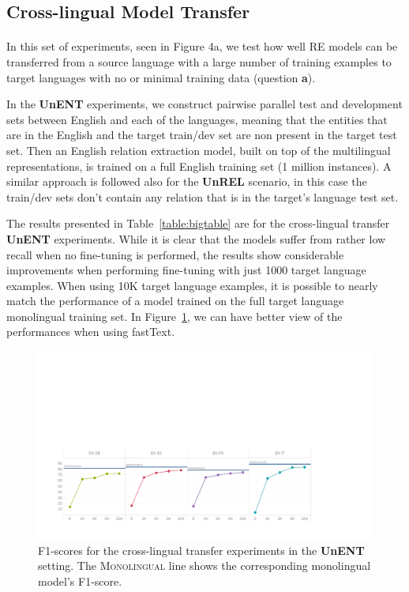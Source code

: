 \newpage
\subsection{Cross-lingual Model Transfer}
\paragraph{}
In this set of experiments, seen in Figure 4a, we test how well RE models can be transferred from a source language with a large number of training examples to target languages with no or minimal training data (question \textbf{a}). 

In the \textbf{UnENT} experiments, we construct pairwise parallel test and development sets between English and each of the languages, meaning that the entities that are in the English and the target train/dev set are non present in the target test set. Then an English relation extraction model, built  on  top  of  the  multilingual representations, is trained on a full English training set (1 million instances). A similar approach is followed also for the \textbf{UnREL} scenario, in this case the train/dev sets don't contain any relation that is in the target's language test set.

The results presented in Table~\ref{table:bigtable} are for the cross-lingual transfer \textbf{UnENT} experiments. While it is clear that the models suffer from rather low recall when no fine-tuning is performed,  the  results  show considerable  improvements when performing fine-tuning with just 1000 target language examples. When using 10K target language examples, it is possible to nearly match the performance of a model trained on the full target language monolingual training set. In Figure~\ref{fig:UnEntF1}, we can have better view of the performances when using fastText.

\begin{figure}[h!]
\centering
\includegraphics[width=\textwidth]{images/UnENT_color_fixed.pdf}
\caption{F1-scores for the cross-lingual transfer experiments in the \textbf{UnENT} setting. The \textsc{Monolingual} line shows the corresponding monolingual model's F1-score.}
\label{fig:UnEntF1}
\end{figure} 

